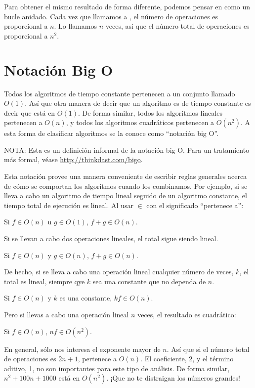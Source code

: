 \documentclass[12pt]{book}
\theoremstyle{exercise}
\begin{document}
Para obtener el mismo resultado de forma diferente, podemos pensar en
 como un bucle anidado. Cada vez que llamamos a
, el número de operaciones es proporcional
a $n$. Lo llamamos $n$ veces, así que el número total de
operaciones es proporcional a $n^2$.


\section{Notación Big O}
\label{big-o-notation}


Todos los algoritmos de tiempo constante pertenecen a un conjunto
llamado $O(1)$. Así que otra manera de decir que un algoritmo es de
tiempo constante es decir que está en $O(1)$. De forma similar, todos
los algoritmos lineales pertenecen a $O(n)$, y todos los algoritmos
cuadráticos pertenecen a $O(n^2)$. A esta forma de clasificar algoritmos
se la conoce como ``notación big O''.

NOTA: Esta es un definición informal de la notación big O. Para un
tratamiento más formal, véase
\url{http://thinkdast.com/bigo}.

Esta notación provee una manera conveniente de escribir reglas generales
acerca de cómo se comportan los algoritmos cuando los combinamos. Por
ejemplo, si se lleva a cabo un algoritmo de tiempo lineal seguido de un
algoritmo constante, el tiempo total de ejecución es lineal. Al usar $\in$
con el significado ``pertenece a'':

Si $f \in O(n)$ u $g \in O(1)$, $f+g \in O(n)$.

Si se llevan a cabo dos operaciones lineales, el total sigue siendo lineal.

Si $f \in O(n)$ y $g \in O(n)$, $f+g \in O(n)$.

De hecho, si se lleva a cabo una operación lineal cualquier número
de veces, $k$, el total es lineal, siempre qye $k$ sea una constante
que no dependa de $n$.

Si $f \in O(n)$ y $k$ es una constante, $kf \in O(n)$.

Pero si llevas a cabo una operación lineal $n$ veces, el resultado
es cuadrático:

Si $f \in O(n)$, $nf \in O(n^2)$.

En general, sólo nos interesa el exponente mayor de $n$. Así que si
el número total de operaciones es $2n + 1$, pertenece a
$O(n)$. El coeficiente, 2, y el término aditivo, 1, no son importantes
para este tipo de análisis. De forma similar, $n^2 + 100n + 1000$ está
en $O(n^2)$.  ¡Que no te distraigan los números grandes!
\end{document}
